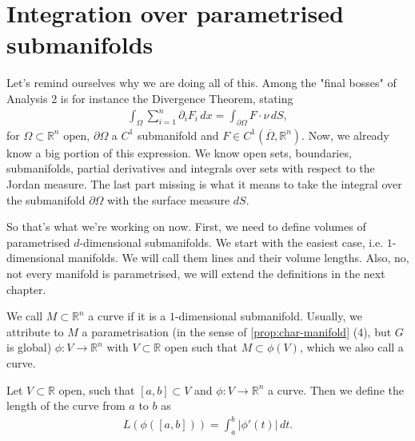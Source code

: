 \section{Integration over parametrised submanifolds}

Let's remind ourselves why we are doing all of this. Among the "final bosses" of Analysis 2 is for instance the Divergence Theorem, stating
\begin{align*}
	\int_{\Omega} \sum_{i=1}^{n} \partial_{i}F_{i} \, dx = \int_{\partial \Omega} F \cdot \nu \, dS,
\end{align*}
for $\Omega \subset \mathbb{R}^{n}$ open, $\partial \Omega$ a $C^{1}$ submanifold and $F \in C^{1}(\overline{ \Omega }, \mathbb{R}^{n})$. Now, we already know a big portion of this expression. We know open sets, boundaries, submanifolds, partial derivatives and integrals over sets with respect to the Jordan measure. The last part missing is what it means to take the integral over the submanifold $\partial \Omega$ with the surface measure $dS$.

So that's what we're working on now. First, we need to define volumes of parametrised $d$-dimensional submanifolds. We start with the easiest case, i.e. $1$-dimensional manifolds. We will call them lines and their volume lengths. Also, no, not every manifold is parametrised, we will extend the definitions in the next chapter. 

\begin{definition}\label{def:curve-new}
	We call $M \subset \mathbb{R}^{n}$ a curve if it is a $1$-dimensional submanifold. Usually, we attribute to $M$ a parametrisation (in the sense of \ref{prop:char-manifold} (4), but $G$ is global) $\phi: V \to \mathbb{R}^{n}$ with $V \subset \mathbb{R}$ open such that $M \subset \phi(V)$, which we also call a curve.
\end{definition}

\begin{definition}\label{def:length}
	Let $V \subset \mathbb{R}$ open, such that $[a,b] \subset V$ and $\phi: V \to \mathbb{R}^{n}$ a curve. Then we define the length of the curve from $a$ to $b$ as
	\begin{align*}
		L(\phi([a,b])) = \int_{a}^{b} \left| \phi'(t) \right| \, dt.
	\end{align*}
\end{definition}

